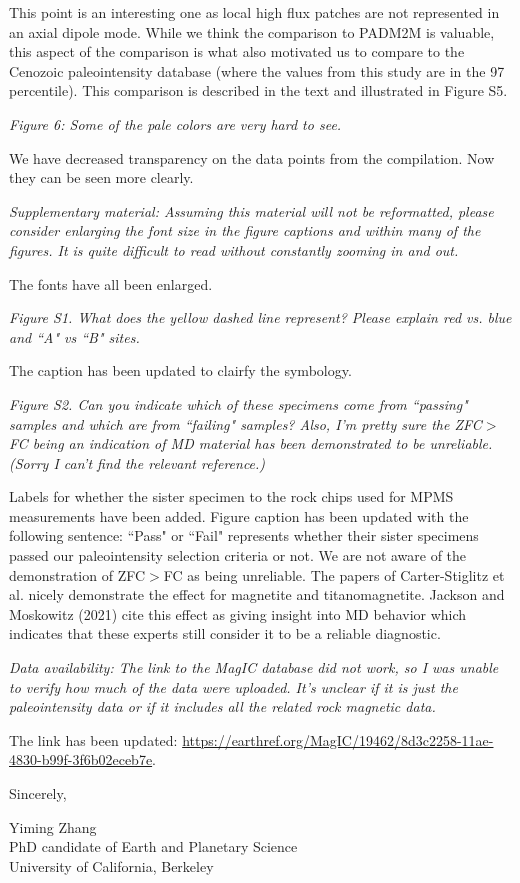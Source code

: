 \documentclass[11pt, letterpaper]{article}
\begin{document}
\begin{flushleft}
This point is an interesting one as local high flux patches are not represented in an axial dipole mode. While we think the comparison to PADM2M is valuable, this aspect of the comparison is what also motivated us to compare to the Cenozoic paleointensity database (where the values from this study are in the 97 percentile). This comparison is described in the text and illustrated in Figure S5.

\textit{Figure 6: Some of the pale colors are very hard to see.}

We have decreased transparency on the data points from the compilation. Now they can be seen more clearly. 

\textit{Supplementary material: Assuming this material will not be reformatted, please consider enlarging the font size in the figure captions and within many of the figures. It is quite difficult to read without constantly zooming in and out.}

The fonts have all been enlarged.

\textit{Figure S1. What does the yellow dashed line represent? Please explain red vs. blue and ``A" vs ``B" sites.}

The caption has been updated to clairfy the symbology.

\textit{Figure S2. Can you indicate which of these specimens come from ``passing" samples and which are from ``failing" samples? Also, I'm pretty sure the ZFC$>$FC being an indication of MD material has been demonstrated to be unreliable. (Sorry I can't find the relevant reference.)}

Labels for whether the sister specimen to the rock chips used for MPMS measurements have been added. Figure caption has been updated with the following sentence: ``Pass" or ``Fail" represents whether their sister specimens passed our paleointensity selection criteria or not. We are not aware of the demonstration of ZFC$>$FC as being unreliable. The papers of Carter-Stiglitz et al. nicely demonstrate the effect for magnetite and titanomagnetite. Jackson and Moskowitz (2021) cite this effect as giving insight into MD behavior which indicates that these experts still consider it to be a reliable diagnostic.  

\textit{Data availability: The link to the MagIC database did not work, so I was unable to verify how much of the data were uploaded. It's unclear if it is just the paleointensity data or if it includes all the related rock magnetic data.}

The link has been updated: \url{https://earthref.org/MagIC/19462/8d3c2258-11ae-4830-b99f-3f6b02eceb7e}. 


Sincerely,

Yiming Zhang\\

PhD candidate of Earth and Planetary Science\\

University of California, Berkeley




\end{flushleft}
\end{document}
